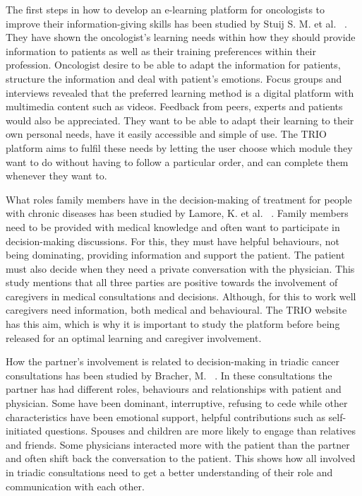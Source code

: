 \documentclass{sigchi}
\begin{document}
The first steps in how to develop an e-learning platform for oncologists to improve their information-giving skills has been studied by Stuij S. M. et al. ~\cite{Stuij2018}. They have shown the oncologist’s learning needs within how they should provide information to patients as well as their training preferences within their profession. Oncologist desire to be able to adapt the information for patients, structure the information and deal with patient’s emotions. Focus groups and interviews revealed that the preferred learning method is a digital platform with multimedia content such as videos. Feedback from peers, experts and patients would also be appreciated. They want to be able to adapt their learning to their own personal needs, have it easily accessible and simple of use. The TRIO platform aims to fulfil these needs by letting the user choose which module they want to do without having to follow a particular order, and can complete them whenever they want to. 

What roles family members have in the decision-making of treatment for people with chronic diseases has been studied by Lamore, K. et al. ~\cite{Lamore2017}. Family members need to be provided with medical knowledge and often want to participate in decision-making discussions. For this, they must have helpful behaviours, not being dominating, providing information and support the patient. The patient must also decide when they need a private conversation with the physician. This study mentions that all three parties are positive towards the involvement of caregivers in medical consultations and decisions. Although, for this to work well caregivers need information, both medical and behavioural. The TRIO website has this aim, which is why it is important to study the platform before being released for an optimal learning and caregiver involvement. 

How the partner’s involvement is related to decision-making in triadic cancer consultations has been studied by Bracher, M. ~\cite{Bracher2019}. In these consultations the partner has had different roles, behaviours and relationships with patient and physician. Some have been dominant, interruptive, refusing to cede while other characteristics have been emotional support, helpful contributions such as self-initiated questions. Spouses and children are more likely to engage than relatives and friends. Some physicians interacted more with the patient than the partner and often shift back the conversation to the patient. This shows how all involved in triadic consultations need to get a better understanding of their role and communication with each other.
\end{document}
